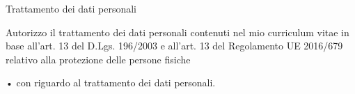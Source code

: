 
\begin{rubric}{Trattamento dei dati personali}

\entry*[] Autorizzo il trattamento dei dati personali contenuti nel mio curriculum vitae in base all’art. 13 del D.Lgs. 
196/2003 e all’art. 13 del Regolamento UE 2016/679 relativo alla protezione delle persone fisiche
 
• con riguardo al trattamento dei dati personali.

\end{rubric}
